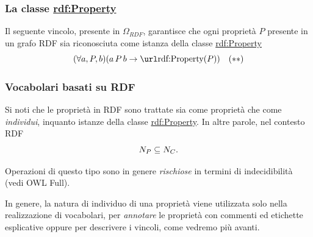 \documentclass[8pt]{beamer}
\begin{document}
\begin{frame}
 \frametitle{La classe \url{rdf:Property}}
Il seguente vincolo, presente in $\Omega_{RDF}$, garantisce che ogni 
propriet\`a $P$ presente in un grafo RDF sia riconosciuta come
istanza della classe \url{rdf:Property} 
\[
  (\forall a,P,b)(a\,P\,b \rightarrow \mathurl{rdf:Property}(P)) \quad (**)
\]

\end{frame} 

\begin{frame}
 \frametitle{Vocabolari basati su RDF}
 Si noti che le propriet\`a in RDF sono trattate sia come propriet\`a che
 come \emph{individui}, inquanto istanze della classe \url{rdf:Property}.
 In altre parole, nel contesto RDF
 \[
  N_P \subseteq N_C .
 \]
 \vspace{\baselineskip}
 
 Operazioni di questo tipo sono in genere \emph{rischiose} in termini 
 di indecidibilit\`a (vedi OWL Full).   
 \vspace{\baselineskip}

 In genere, la natura di individuo di una propriet\`a viene utilizzata
 solo nella realizzazione di vocabolari, per \emph{annotare} le propriet\`a
 con commenti ed etichette esplicative oppure per descrivere i vincoli,
 come vedremo più avanti.
\end{frame} 
\end{document}
